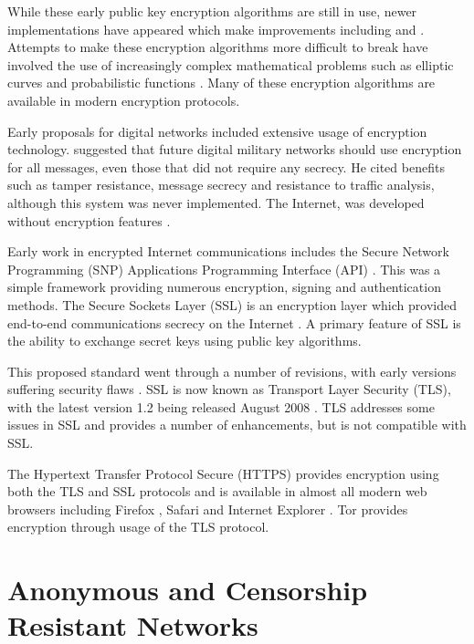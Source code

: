 \documentclass{ecuthesis}
\begin{document}
While these early public key encryption algorithms are still in use, newer
implementations have appeared which make improvements including
\textcite*{ElGamal:1985p529} and \textcite{Cramer:1998p3186}. Attempts to make
these encryption algorithms more difficult to break have involved the use of
increasingly complex mathematical problems such as elliptic curves
\parencite{Miller:1986p2966,Koblitz:1987p3109} and probabilistic functions
\parencite{Paillier:1999p3152}. Many of these encryption algorithms are
available in modern encryption protocols.

Early proposals for digital networks included extensive usage of encryption
technology. \textcite{Baran:1964p384} suggested that future digital military
networks should use encryption for all messages, even those that did not
require any secrecy. He cited benefits such as tamper resistance, message
secrecy and resistance to traffic analysis, although this system was never
implemented. The Internet, was developed without encryption features
\parencite{website:internet}.

Early work in encrypted Internet communications includes the Secure Network
Programming (SNP) Applications Programming Interface (API)
\parencite{Woo:1994p2532}. This was a simple framework providing numerous
encryption, signing and authentication methods. The Secure Sockets Layer (SSL)
is an encryption layer which provided end-to-end communications secrecy on the
Internet \parencite{website:SSL}. A primary feature of SSL is the ability to
exchange secret keys using public key algorithms.

This proposed standard went through a number of revisions, with early versions
suffering security flaws \parencite{Wagner:1996p385}. SSL is now known as
Transport Layer Security (TLS), with the latest version 1.2 being released
August 2008 \parencite{website:TLS}. TLS addresses some issues in SSL and
provides a number of enhancements, but is not compatible with SSL.

The Hypertext Transfer Protocol Secure (HTTPS) provides encryption using both
the TLS and SSL protocols \parencite{website:HTTPS} and is available in almost
all modern web browsers including Firefox
\parencite{website:firefox-encryption}, Safari
\parencite{website:safari-features} and Internet Explorer
\parencite{website:microsoft-tls}. Tor provides encryption through usage of the
TLS protocol.

\section{Anonymous and Censorship Resistant Networks}
\end{document}
